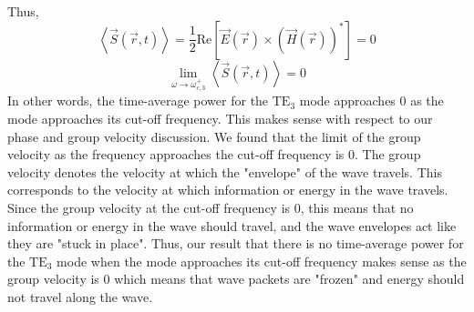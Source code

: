 \documentclass[12pt]{article}
\begin{document}
\begin{enumerate}
\begin{enumerate}
		Thus, 
		\[\left\langle \vec S(\vec r, t)\right \rangle = \frac{1}{2}\mathrm{Re}\left[\vec E(\vec r)\times (\vec H(\vec r))^*\right]=0\]
		\[\boxed{\lim_{\omega \to \omega_{c,3}^+}\left\langle \vec S(\vec r,t)\right \rangle = 0}\]
		In other words, the time-average power for the $\mathrm{TE}_3$ mode approaches 0 as the mode approaches its cut-off frequency.
		This makes sense with respect to our phase and group velocity discussion.
		We found that the limit of the group velocity as the frequency approaches the cut-off frequency is $0$.
		The group velocity denotes the velocity at which the "envelope" of the wave travels.
		This corresponds to the velocity at which information or energy in the wave travels.
		Since the group velocity at the cut-off frequency is $0$, this means that no information or energy in the wave should travel, and the wave envelopes act like they are "stuck in place".
		Thus, our result that there is no time-average power for the $\mathrm{TE}_3$ mode when the mode approaches its cut-off frequency makes sense as the group velocity is $0$ which means that wave packets are "frozen" and energy should not travel along the wave.


	\end{enumerate}
			
\end{enumerate}

		
\end{document}
